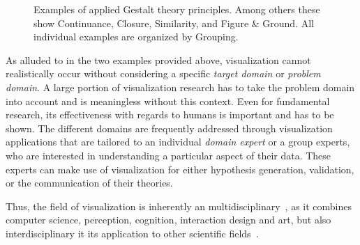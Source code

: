 \begin{figure}
  \centering
  \caption{Examples of applied Gestalt theory principles.  Among others these show Continuance, Closure, Similarity, and Figure \& Ground.  All individual examples are organized by Grouping.}
  \label{fig:motivation:gestalt}
\end{figure}

As alluded to in the two examples provided above, visualization cannot realistically occur without considering a specific \emph{target domain} or \emph{problem domain}.  A large portion of visualization research has to take the problem domain into account and is meaningless without this context.  Even for fundamental research, its effectiveness with regards to humans is important and has to be shown.  The different domains are frequently addressed through visualization applications that are tailored to an individual \emph{domain expert} or a group experts, who are interested in understanding a particular aspect of their data.  These experts can make use of visualization for either hypothesis generation, validation, or the communication of their theories.

Thus, the field of visualization is inherently an multidisciplinary~\cite{defanti1989visualization}, as it combines computer science, perception, cognition, interaction design and art, but also interdisciplinary it its application to other scientific fields~\cite{kirby2013visualization}.


